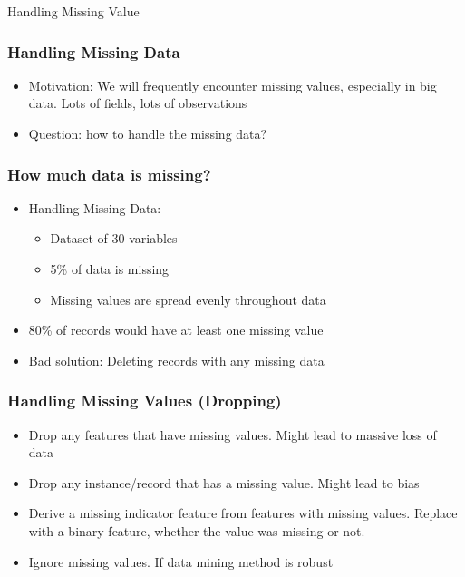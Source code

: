 \begin{frame}
  \begin{center}
    {\Large Handling Missing Value}
  \end{center}
\end{frame}



\begin{frame}[fragile]\frametitle{Handling Missing Data}	
	\begin{itemize}
	\item Motivation: We will frequently encounter missing values, especially in big data. Lots of fields, lots of observations
	\item Question: how to handle the missing data?
	\end{itemize}

\end{frame}

\begin{frame}[fragile]\frametitle{How much data is missing?}	
\begin{itemize}
\item Handling Missing Data:
	\begin{itemize}
	\item Dataset of 30 variables
	\item 5\% of data is missing
	\item Missing values are spread evenly throughout data
	\end{itemize}
\item 80\% of records would have at least one missing value
\item Bad solution: Deleting records with any missing data
\end{itemize}
\end{frame}

\begin{frame}[fragile]\frametitle{Handling Missing Values (Dropping)}	
\begin{itemize}
\item Drop any features that have missing values. Might lead to massive loss of data
\item Drop any instance/record that has a missing value. Might lead to bias
\item Derive a missing indicator feature from features with missing values. Replace with a binary feature, whether the value was missing or not.
\item Ignore missing values. If data mining method is robust
\end{itemize}
\end{frame}


